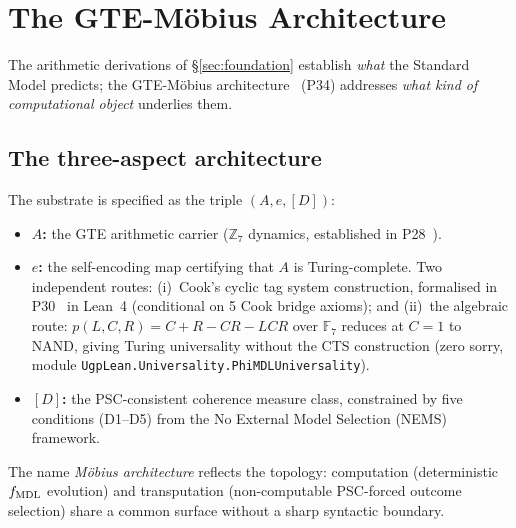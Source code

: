 \documentclass[11pt]{article}
\theoremstyle{remark}
\newcommand{\ZS}{\mathbb{Z}_7}
\newcommand{\fmdl}{f_{\rm MDL}}
\newcommand{\lean}[1]{%
  \penalty-100
  \begingroup\def\_{\textunderscore\allowbreak}\texttt{#1}\endgroup}
\begin{document}
\section{The GTE-M\"{o}bius Architecture}
\label{sec:substrate}

The arithmetic derivations of \S\ref{sec:foundation} establish \emph{what} the
Standard Model predicts; the GTE-M\"obius architecture~\cite{SpivackGTEMobius}
(P34) addresses \emph{what kind of computational object} underlies them.

\subsection{The three-aspect architecture}

The substrate is specified as the triple $(A, e, [D])$:
\begin{itemize}[nosep]
  \item \textbf{$A$:} the GTE arithmetic carrier ($\ZS$ dynamics, established in P28~\cite{SpivackCompUniversality}).
  \item \textbf{$e$:} the self-encoding map certifying that $A$ is Turing-complete.
    Two independent routes: (i)~Cook's cyclic tag system construction, formalised in
    P30~\cite{SpivackCookTheorem} in Lean~4 (conditional on 5 Cook bridge axioms); and
    (ii)~the algebraic route: $p(L,C,R)=C+R-CR-LCR$ over $\mathbb{F}_7$ reduces at
    $C=1$ to NAND, giving Turing universality without the CTS construction (zero sorry,
    module \lean{UgpLean.Universality.PhiMDLUniversality}).
  \item \textbf{$[D]$:} the PSC-consistent coherence measure class, constrained by five
    conditions (D1--D5) from the No External Model Selection (NEMS) framework.
\end{itemize}
The name \emph{M\"obius architecture} reflects the topology: computation (deterministic
$\fmdl$ evolution) and transputation (non-computable PSC-forced outcome selection)
share a common surface without a sharp syntactic boundary.
\end{document}
